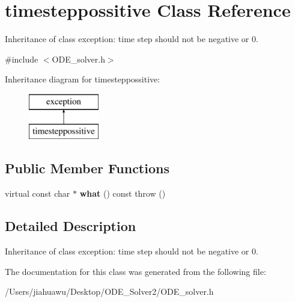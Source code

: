 \hypertarget{classtimesteppossitive}{}\section{timesteppossitive Class Reference}
\label{classtimesteppossitive}


Inheritance of class exception\+: time step should not be negative or 0.  




{\ttfamily \#include $<$O\+D\+E\+\_\+solver.\+h$>$}

Inheritance diagram for timesteppossitive\+:\begin{figure}[H]
\begin{center}
\leavevmode
\includegraphics[height=2.000000cm]{classtimesteppossitive}
\end{center}
\end{figure}
\subsection*{Public Member Functions}
\begin{DoxyCompactItemize}
\item 
\mbox{\label{classtimesteppossitive_acd3f5fd077ab556acf7f5abf73c87e3c}} 
virtual const char $\ast$ {\bfseries what} () const  throw ()
\end{DoxyCompactItemize}


\subsection{Detailed Description}
Inheritance of class exception\+: time step should not be negative or 0. 

The documentation for this class was generated from the following file\+:\begin{DoxyCompactItemize}
\item 
/\+Users/jiahuawu/\+Desktop/\+O\+D\+E\+\_\+\+Solver2/O\+D\+E\+\_\+solver.\+h\end{DoxyCompactItemize}
